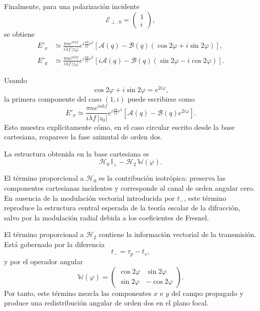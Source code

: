 Finalmente, para una polarización incidente
\begin{equation}
\mathscr E_{\perp,0}
=
\begin{pmatrix}
1\\
i
\end{pmatrix},
\end{equation}
se obtiene
\begin{equation}
\begin{aligned}
E'_x
&\simeq
\frac{\pi n e^{inkf}}{i\lambda f\,|z_0|}
e^{i\frac{nk}{2f}r^2}
\left[
\mathcal A(q)
-
\mathcal B(q)
\left(
\cos2\varphi+i\sin2\varphi
\right)
\right],
\\
E'_y
&\simeq
\frac{\pi n e^{inkf}}{i\lambda f\,|z_0|}
e^{i\frac{nk}{2f}r^2}
\left[
i\mathcal A(q)
-
\mathcal B(q)
\left(
\sin2\varphi-i\cos2\varphi
\right)
\right].
\end{aligned}
\label{eq:cartesian_case_1i}
\end{equation}

Usando
\begin{equation}
  \cos2\varphi+i\sin2\varphi
  =
  e^{2i\varphi},
\end{equation}
la primera componente del caso $(1,i)$ puede escribirse como
\begin{equation}
E'_x
\simeq
\frac{\pi n e^{inkf}}{i\lambda f\,|z_0|}
e^{i\frac{nk}{2f}r^2}
\left[
\mathcal A(q)
-
\mathcal B(q)e^{2i\varphi}
\right].
\end{equation}
Esto muestra explícitamente cómo, en el caso circular escrito desde la base
cartesiana, reaparece la fase azimutal de orden dos.

La estructura obtenida en la base cartesiana es
\begin{equation}
  \mathscr H_0\,\mathbb I_\perp
  -
  \mathscr H_2\,\mathbb W(\varphi).
\end{equation}

El término proporcional a $\mathscr H_0$ es la contribución isotrópica:
preserva las componentes cartesianas incidentes y corresponde al canal de
orden angular cero. En ausencia de la modulación vectorial introducida por
$t_-$, este término reproduce la estructura central esperada de la teoría
escalar de la difracción, salvo por la modulación radial debida a los
coeficientes de Fresnel.

El término proporcional a $\mathscr H_2$ contiene la información vectorial de
la transmisión. Está gobernado por la diferencia
\begin{equation}
  t_-
  =
  \tau_p-t_s,
\end{equation}
y por el operador angular
\begin{equation}
  \mathbb W(\varphi)
  =
  \begin{pmatrix}
    \cos 2\varphi & \sin 2\varphi \\
    \sin 2\varphi & -\cos 2\varphi
  \end{pmatrix}.
\end{equation}
Por tanto, este término mezcla las componentes $x$ e $y$ del campo propagado
y produce una redistribución angular de orden dos en el plano focal.

